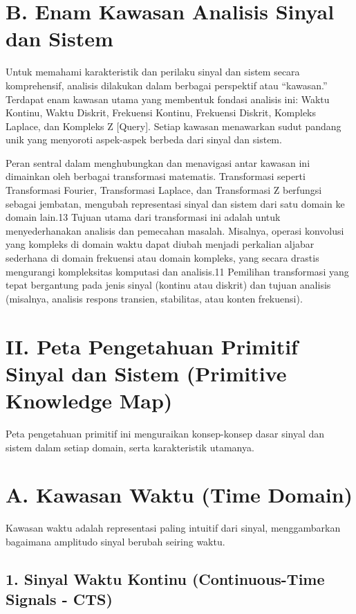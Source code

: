 \documentclass[
  letterpaper,
  DIV=11,
  numbers=noendperiod]{scrreprt}
\begin{document}
\section{B. Enam Kawasan Analisis Sinyal dan
Sistem}\label{b.-enam-kawasan-analisis-sinyal-dan-sistem}

Untuk memahami karakteristik dan perilaku sinyal dan sistem secara
komprehensif, analisis dilakukan dalam berbagai perspektif atau
``kawasan.'' Terdapat enam kawasan utama yang membentuk fondasi analisis
ini: Waktu Kontinu, Waktu Diskrit, Frekuensi Kontinu, Frekuensi Diskrit,
Kompleks Laplace, dan Kompleks Z {[}Query{]}. Setiap kawasan menawarkan
sudut pandang unik yang menyoroti aspek-aspek berbeda dari sinyal dan
sistem.

Peran sentral dalam menghubungkan dan menavigasi antar kawasan ini
dimainkan oleh berbagai transformasi matematis. Transformasi seperti
Transformasi Fourier, Transformasi Laplace, dan Transformasi Z berfungsi
sebagai jembatan, mengubah representasi sinyal dan sistem dari satu
domain ke domain lain.13 Tujuan utama dari transformasi ini adalah untuk
menyederhanakan analisis dan pemecahan masalah. Misalnya, operasi
konvolusi yang kompleks di domain waktu dapat diubah menjadi perkalian
aljabar sederhana di domain frekuensi atau domain kompleks, yang secara
drastis mengurangi kompleksitas komputasi dan analisis.11 Pemilihan
transformasi yang tepat bergantung pada jenis sinyal (kontinu atau
diskrit) dan tujuan analisis (misalnya, analisis respons transien,
stabilitas, atau konten frekuensi).

\section{II. Peta Pengetahuan Primitif Sinyal dan Sistem (Primitive
Knowledge
Map)}\label{ii.-peta-pengetahuan-primitif-sinyal-dan-sistem-primitive-knowledge-map}

Peta pengetahuan primitif ini menguraikan konsep-konsep dasar sinyal dan
sistem dalam setiap domain, serta karakteristik utamanya.

\section{A. Kawasan Waktu (Time
Domain)}\label{a.-kawasan-waktu-time-domain}

Kawasan waktu adalah representasi paling intuitif dari sinyal,
menggambarkan bagaimana amplitudo sinyal berubah seiring waktu.

\subsection{1. Sinyal Waktu Kontinu (Continuous-Time Signals -
CTS)}\label{sinyal-waktu-kontinu-continuous-time-signals---cts}
\end{document}
